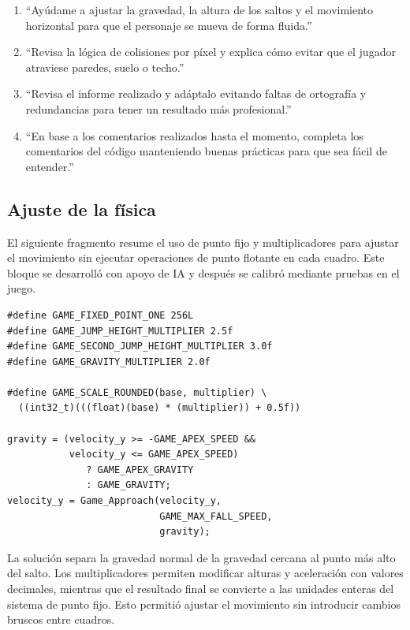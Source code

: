 \documentclass[11pt,letterpaper]{article}
\begin{document}
\begin{enumerate}[leftmargin=1.6em,itemsep=0.35em]
  \item ``Ayúdame a ajustar la gravedad, la altura de los saltos y el movimiento
  horizontal para que el personaje se mueva de forma fluida.''
  \item ``Revisa la lógica de colisiones por píxel y explica cómo evitar que el
  jugador atraviese paredes, suelo o techo.''
  \item ``Revisa el informe realizado y adáptalo evitando faltas de ortografía y
  redundancias para tener un resultado más profesional.''
  \item ``En base a los comentarios realizados hasta el momento, completa los
  comentarios del código manteniendo buenas prácticas para que sea fácil de
  entender.''
\end{enumerate}

\subsection{Ajuste de la física}

El siguiente fragmento resume el uso de punto fijo y multiplicadores para ajustar el
movimiento sin ejecutar operaciones de punto flotante en cada cuadro. Este bloque se
desarrolló con apoyo de IA y después se calibró mediante pruebas en el juego.

\begin{lstlisting}[caption={Parámetros principales de movimiento ajustados con apoyo de IA.}]
#define GAME_FIXED_POINT_ONE 256L
#define GAME_JUMP_HEIGHT_MULTIPLIER 2.5f
#define GAME_SECOND_JUMP_HEIGHT_MULTIPLIER 3.0f
#define GAME_GRAVITY_MULTIPLIER 2.0f

#define GAME_SCALE_ROUNDED(base, multiplier) \
  ((int32_t)(((float)(base) * (multiplier)) + 0.5f))

gravity = (velocity_y >= -GAME_APEX_SPEED &&
           velocity_y <= GAME_APEX_SPEED)
              ? GAME_APEX_GRAVITY
              : GAME_GRAVITY;
velocity_y = Game_Approach(velocity_y,
                           GAME_MAX_FALL_SPEED,
                           gravity);
\end{lstlisting}

La solución separa la gravedad normal de la gravedad cercana al punto más alto del
salto. Los multiplicadores permiten modificar alturas y aceleración con valores
decimales, mientras que el resultado final se convierte a las unidades enteras del
sistema de punto fijo. Esto permitió ajustar el movimiento sin introducir cambios
bruscos entre cuadros.
\end{document}
